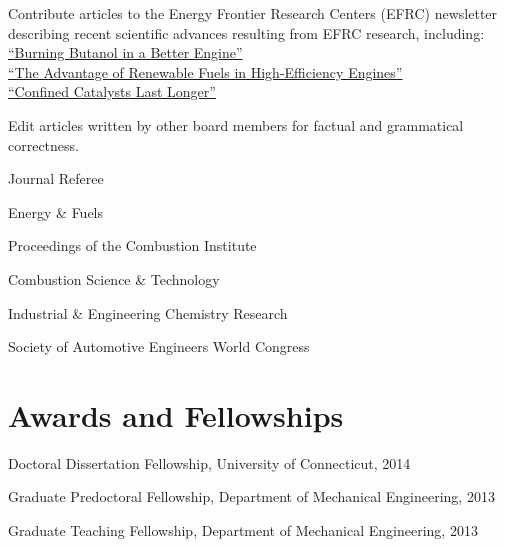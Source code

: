 \begin{innerlist}
\item[] Contribute articles to the Energy Frontier Research Centers (EFRC)
newsletter describing recent scientific advances resulting from
EFRC research, including:\\
\hspace*{0.25in}\href{http://www.energyfrontier.us/newsletter/201210/burning-butanol-better-engine}
{``Burning Butanol in a Better Engine''}\\
\hspace*{0.25in}\href{http://www.energyfrontier.us/newsletter/201401/advantage-renewable-fuels-high-efficiency-engines}
{``The Advantage of Renewable Fuels in High-Efficiency Engines''}\\
\hspace*{0.25in}\href{http://www.energyfrontier.us/newsletter/201404/confined-catalysts-last-longer}
{``Confined Catalysts Last Longer''}
\item[] Edit articles written by other board members for factual and grammatical correctness.
\end{innerlist}

\vspace{\baselineskip}

Journal Referee
   \begin{innerlist}
       \item[] Energy \& Fuels
       \item[] Proceedings of the Combustion Institute
       \item[] Combustion Science \& Technology
       \item[] Industrial \& Engineering Chemistry Research
       \item[] Society of Automotive Engineers World Congress
   \end{innerlist}

\vspace{0.5em}

\section{{\sectionfont Awards and Fellowships}}

Doctoral Dissertation Fellowship, University of Connecticut, 2014

Graduate Predoctoral Fellowship, Department of Mechanical
Engineering, 2013

Graduate Teaching Fellowship, Department of Mechanical Engineering, 2013

